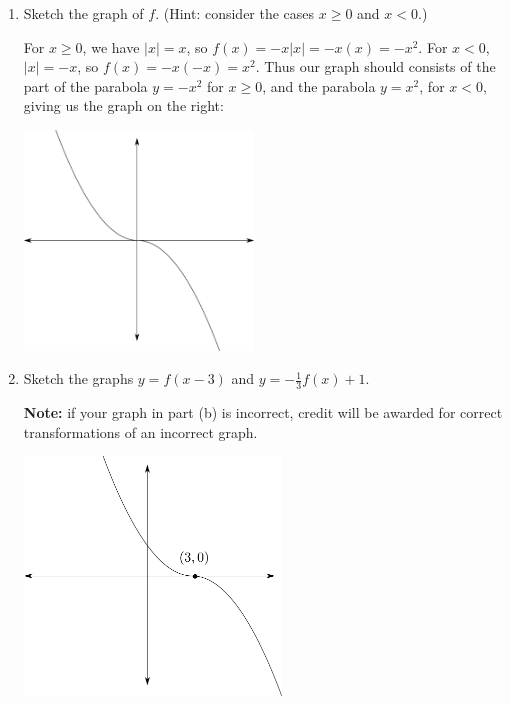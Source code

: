 \documentclass[12pt]{article}
\newcommand{\points}[1]{\marginpar{\hspace{24pt}[#1]}}
\newcommand{\abs}[1]{\lvert #1\rvert}
\begin{document}
\begin{enumerate}
\begin{enumerate}
 \item Sketch the graph of $f$. (Hint: consider the cases $x\geq 0$ and $x<0$.) \points{3}

\begin{multicols}{2}
 For $x\geq 0$, we have $\abs{x}=x$, so $f(x)=-x\abs{x} = -x(x)=-x^2$. For $x<0$, $\abs{x}=-x$, so $f(x) = -x(-x)=x^2$. Thus our graph should consists of the part of the parabola $y=-x^2$ for $x\geq 0$, and the parabola $y=x^2$, for $x<0$, giving us the graph on the right:
\columnbreak
\begin{center}
 \includegraphics[height=2.3in]{Plot4(b)B.pdf}
\end{center}

\end{multicols}


 \item Sketch the graphs $y=f(x-3)$ and $y=-\frac{1}{3}f(x)+1$. \points{4}

{\bf Note:} if your graph in part (b) is incorrect, credit will be awarded for correct transformations of an incorrect graph.

\begin{multicols}{2}
 \begin{center}
 \includegraphics[height=2.5in]{Plot4(c)1B.pdf}


\end{center}
\end{multicols}
\end{enumerate}
\end{enumerate}
\end{document}
